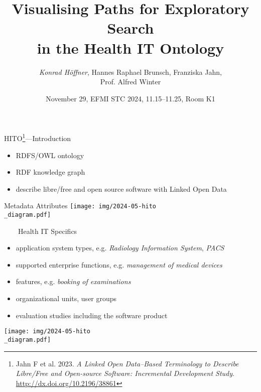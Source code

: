 \documentclass[aspectratio=1610,12pt]{beamer}
\author{\emph{Konrad Höffner}, Hannes Raphael Brunsch, Franziska Jahn,\\Prof. Alfred Winter}
\title{\large Visualising Paths for Exploratory Search\\in the Health IT Ontology}
\date{November 29, EFMI STC 2024, 11.15--11.25, Room K1}
\begin{document}
\begin{frame}
\titlepage
\end{frame}


\begin{frame}[plain]{HITO\footnote{Jahn F et al. 2023. \emph{A Linked Open Data–Based Terminology to Describe Libre/Free and Open-source Software: Incremental Development Study}. \url{http://dx.doi.org/10.2196/38861}}---Introduction}
\begin{itemize}
\item RDFS/OWL ontology
\item RDF knowledge graph
\item describe libre/free and open source software with Linked Open Data
\end{itemize}

\end{frame}

{
\begin{frame}[plain]{Metadata Attributes}
\centering\texttt{[image: img/2024-05-hito\\\_diagram.pdf]}
\end{frame}
\restoregeometry
}

{
\begin{frame}{~~~~Health IT Specifics}
\begin{itemize}
\item application system types, e.g. \emph{Radiology Information System}, \emph{PACS}
\item supported enterprise functions, e.g. \emph{management of medical devices}
\item features, e.g. \emph{booking of examinations}
\item organizational units, user groups
\item evaluation studies including the software product
\end{itemize}
\centering\texttt{[image: img/2024-05-hito\\\_diagram.pdf]}
\end{frame}
\restoregeometry
}
\end{document}

